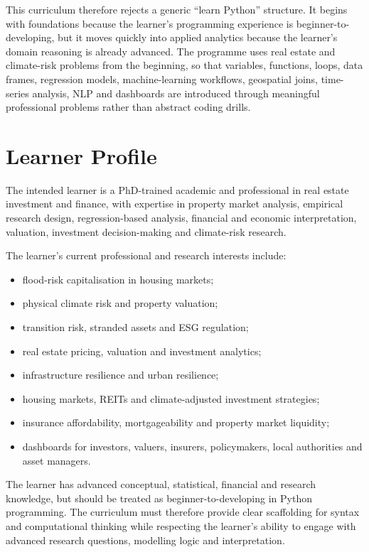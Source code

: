 \documentclass[
  a4paper,
]{article}
\providecommand{\tightlist}{%
  \setlength{\itemsep}{0pt}\setlength{\parskip}{0pt}}
\begin{document}
This curriculum therefore rejects a generic ``learn Python'' structure.
It begins with foundations because the learner's programming experience
is beginner-to-developing, but it moves quickly into applied analytics
because the learner's domain reasoning is already advanced. The
programme uses real estate and climate-risk problems from the beginning,
so that variables, functions, loops, data frames, regression models,
machine-learning workflows, geospatial joins, time-series analysis, NLP
and dashboards are introduced through meaningful professional problems
rather than abstract coding drills.

\section{Learner Profile}\label{learner-profile}

The intended learner is a PhD-trained academic and professional in real
estate investment and finance, with expertise in property market
analysis, empirical research design, regression-based analysis,
financial and economic interpretation, valuation, investment
decision-making and climate-risk research.

The learner's current professional and research interests include:

\begin{itemize}
\tightlist
\item
  flood-risk capitalisation in housing markets;
\item
  physical climate risk and property valuation;
\item
  transition risk, stranded assets and ESG regulation;
\item
  real estate pricing, valuation and investment analytics;
\item
  infrastructure resilience and urban resilience;
\item
  housing markets, REITs and climate-adjusted investment strategies;
\item
  insurance affordability, mortgageability and property market
  liquidity;
\item
  dashboards for investors, valuers, insurers, policymakers, local
  authorities and asset managers.
\end{itemize}

The learner has advanced conceptual, statistical, financial and research
knowledge, but should be treated as beginner-to-developing in Python
programming. The curriculum must therefore provide clear scaffolding for
syntax and computational thinking while respecting the learner's ability
to engage with advanced research questions, modelling logic and
interpretation.
\end{document}
